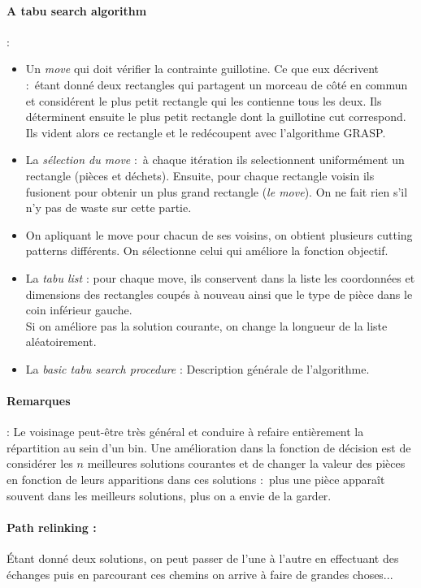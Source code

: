 \documentclass{article}
\begin{document}
    \paragraph{A tabu search algorithm} :
    \begin{itemize}
        \item Un \textit{move} qui doit vérifier la contrainte guillotine. Ce que eux décrivent : étant donné deux rectangles qui partagent un morceau de côté en commun et considérent le plus petit rectangle qui les contienne tous les deux. Ils déterminent ensuite le plus petit rectangle dont la guillotine cut correspond. Ils vident alors ce rectangle et le 
        redécoupent avec l'algorithme GRASP.
        \item La \textit{sélection du move} : à chaque itération ils selectionnent uniformément un rectangle (pièces et déchets). Ensuite, pour chaque rectangle voisin ils fusionent pour obtenir un plus grand rectangle (\textit{le move}). On ne fait rien s'il n'y pas de waste sur cette partie. 
        \item On apliquant le move pour chacun de ses voisins, on obtient plusieurs cutting patterns différents. On sélectionne celui qui améliore la fonction objectif.
        \item La \textit{tabu list} : pour chaque move, ils conservent dans la liste les coordonnées et dimensions des rectangles coupés à nouveau ainsi que le type de pièce dans le coin inférieur gauche.\\
        Si on améliore pas la solution courante, on change la longueur de la liste aléatoirement.
        \item La \textit{basic tabu search procedure} : Description générale de l'algorithme.
    \end{itemize} 
    
    \paragraph{Remarques} : Le voisinage peut-être très général et conduire à refaire entièrement la répartition au sein d'un bin. Une amélioration dans la fonction de décision est de considérer les $n$ meilleures solutions courantes et de changer la valeur des pièces en fonction de leurs apparitions dans ces solutions : plus une pièce apparaît souvent dans les meilleurs solutions, plus on a envie de la garder.

    \paragraph{Path relinking :} Étant donné deux solutions, on peut passer de l'une à l'autre en effectuant des échanges puis en parcourant ces chemins on arrive à faire de grandes choses...
\end{document}
